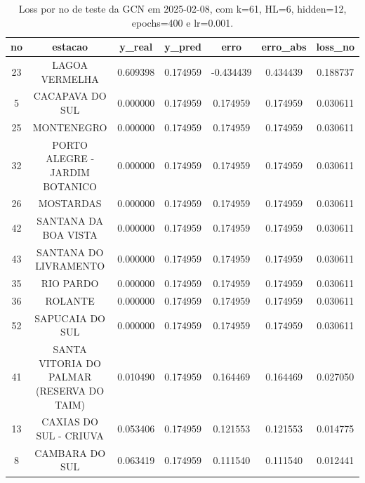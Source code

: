 \begin{table}[h]
\centering
\caption{Loss por no de teste da GCN em 2025-02-08, com k=61, HL=6, hidden=12, epochs=400 e lr=0.001.}
\label{tab:gcn_loss_k61_hl6_h12_e400_d20250208}
\begin{tabular}{ccccccc}
\toprule
no & estacao & y\_real & y\_pred & erro & erro\_abs & loss\_no \\
\midrule
23 & LAGOA VERMELHA & 0.609398 & 0.174959 & -0.434439 & 0.434439 & 0.188737 \\
5 & CACAPAVA DO SUL & 0.000000 & 0.174959 & 0.174959 & 0.174959 & 0.030611 \\
25 & MONTENEGRO & 0.000000 & 0.174959 & 0.174959 & 0.174959 & 0.030611 \\
32 & PORTO ALEGRE - JARDIM BOTANICO & 0.000000 & 0.174959 & 0.174959 & 0.174959 & 0.030611 \\
26 & MOSTARDAS & 0.000000 & 0.174959 & 0.174959 & 0.174959 & 0.030611 \\
42 & SANTANA DA BOA VISTA & 0.000000 & 0.174959 & 0.174959 & 0.174959 & 0.030611 \\
43 & SANTANA DO LIVRAMENTO & 0.000000 & 0.174959 & 0.174959 & 0.174959 & 0.030611 \\
35 & RIO PARDO & 0.000000 & 0.174959 & 0.174959 & 0.174959 & 0.030611 \\
36 & ROLANTE & 0.000000 & 0.174959 & 0.174959 & 0.174959 & 0.030611 \\
52 & SAPUCAIA DO SUL & 0.000000 & 0.174959 & 0.174959 & 0.174959 & 0.030611 \\
41 & SANTA VITORIA DO PALMAR (RESERVA DO TAIM) & 0.010490 & 0.174959 & 0.164469 & 0.164469 & 0.027050 \\
13 & CAXIAS DO SUL - CRIUVA & 0.053406 & 0.174959 & 0.121553 & 0.121553 & 0.014775 \\
8 & CAMBARA DO SUL & 0.063419 & 0.174959 & 0.111540 & 0.111540 & 0.012441 \\
\bottomrule
\end{tabular}
\end{table}
